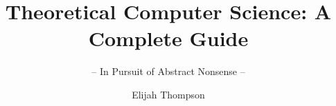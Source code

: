 \documentclass[graybox,envcountchap,sectrefs]{style/svmono}
\begin{document}
\author{Elijah Thompson}
\title{Theoretical Computer Science: A Complete Guide}
\subtitle{-- In Pursuit of Abstract Nonsense --}
\maketitle

\frontmatter%

%
%

%

\tableofcontents

%


\mainmatter%




\backmatter%
%
%
%
\printindex

\end{document}
